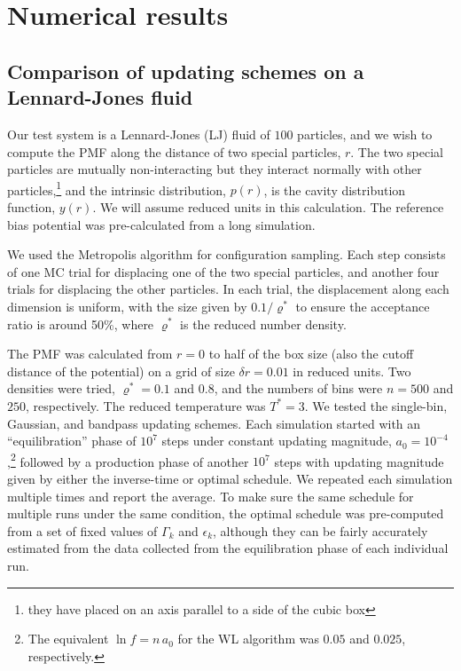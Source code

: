 \documentclass[reprint, superscriptaddress, floatfix]{revtex4-1}
\begin{document}
\section{\label{sec:results}
Numerical results}



\subsection{\label{sec:lj}
Comparison of updating schemes on a Lennard-Jones fluid}


Our test system is a Lennard-Jones (LJ) fluid of $100$ particles,
and we wish to compute the PMF along the distance of two special particles, $r$.
%
The two special particles are mutually non-interacting
but they interact normally with other particles,\footnote{they
have placed on an axis parallel to a side of the cubic box}
and the intrinsic distribution, $p(r)$, is
the cavity distribution function, $y(r)$\cite{hansen}.
%
We will assume reduced units in this calculation.
%
The reference bias potential was pre-calculated from a long simulation.

We used the Metropolis algorithm\cite{frenkel, metropolis1953}
for configuration sampling.
%
Each step consists of
one MC trial for displacing one of the two special particles,
and another four trials for displacing the other particles.
%
In each trial, the displacement along each dimension is uniform,
with the size given by $0.1/\varrho^*$
to ensure the acceptance ratio is around 50\%,
where $\varrho^*$ is the reduced number density.


The PMF was calculated from $r = 0$ to half of the box size
(also the cutoff distance of the potential)
on a grid of size $\delta r = 0.01$ in reduced units.
%
Two densities were tried, $\varrho^* = 0.1$ and $0.8$,
and the numbers of bins were $n = 500$ and $250$, respectively.
%
The reduced temperature was $T^* = 3$.
%
We tested the single-bin, Gaussian, and bandpass updating schemes.
%
Each simulation started with an ``equilibration'' phase
of $10^7$ steps under constant updating magnitude,
$a_0 = 10^{-4}$,\footnote{The equivalent $\ln f = n \, a_0$ for the WL algorithm
was $0.05$ and $0.025$, respectively.}
followed by a production phase of another $10^7$ steps
with updating magnitude given by
either the inverse-time or optimal schedule.
%
We repeated each simulation multiple times
and report the average.
%
To make sure the same schedule for multiple runs under the same condition,
the optimal schedule was pre-computed from a set of fixed values of
$\Gamma_k$ and $\epsilon_k$,
although they can be fairly accurately estimated from the data
collected from the equilibration phase of each individual run.
\end{document}
